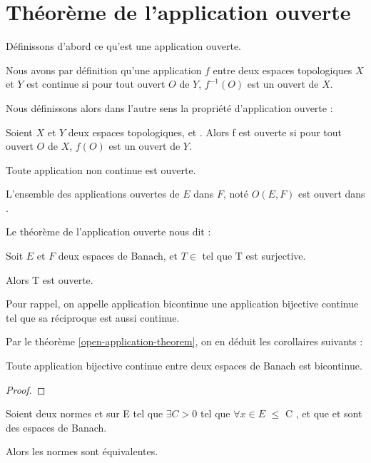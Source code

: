 \section{Théorème de l'application ouverte}

Définissons d'abord ce qu'est une application ouverte.

Nous avons par définition qu'une application $f$ entre deux espaces topologiques
$X$ et $Y$ est continue si pour tout ouvert $O$ de $Y$, $f^{-1}(O)$ est un
ouvert de $X$.

Nous définissons alors dans l'autre sens la propriété d'application ouverte :

\begin{definition}
	Soient $X$ et $Y$ deux espaces topologiques, et . Alors
	f est ouverte si pour tout ouvert $O$ de $X$, $f(O)$ est un ouvert de $Y$.
\end{definition}

\begin{proposition}
	Toute application non continue est ouverte.
\end{proposition}

\begin{proposition}
	L'ensemble des applications ouvertes de $E$ dans $F$, noté $O(E, F)$ est ouvert dans .
\end{proposition}

Le théorème de l'application ouverte nous dit :

\begin{theorem} 
	Soit $E$ et $F$ deux espaces de Banach, et $T \in$  tel
	que T est surjective.

	Alors T est ouverte.
	\label{open-application-theorem}
\end{theorem}

Pour rappel, on appelle application bicontinue une application bijective
continue tel que sa réciproque est aussi continue.

Par le théorème \ref{open-application-theorem}, on en déduit les corollaires
suivants :

\begin{corollary}
	Toute application bijective continue entre deux espaces de Banach est bicontinue.
\end{corollary}

\begin{proof}
	
\end{proof}

\begin{corollary}
	Soient deux normes  et  sur E tel que
	$\exists C > 0$ tel que $\forall x \in E$  $\leq$
	C , et que  et
	 sont des espaces de Banach.
	
	Alors les normes sont équivalentes.
\end{corollary}

